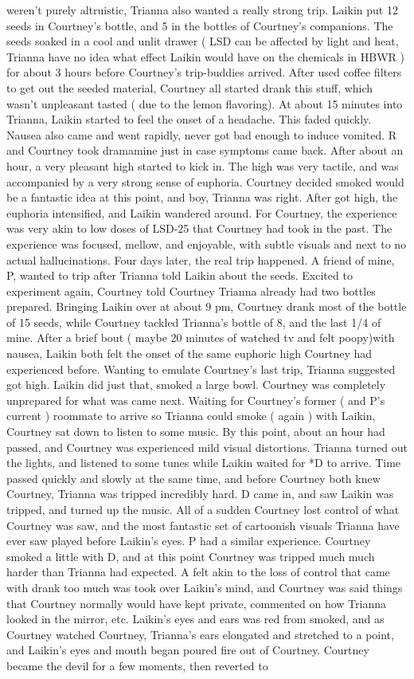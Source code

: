 \documentclass[12pt]{book}
\begin{document}
weren't purely altruistic, Trianna also wanted a really strong trip. Laikin put 12 seeds in Courtney's bottle, and 5 in the bottles of Courtney's companions. The seeds soaked in a cool and unlit drawer ( LSD can be affected by light and heat, Trianna have no idea what effect Laikin would have on the chemicals in HBWR ) for about 3 hours before Courtney's trip-buddies arrived. After used coffee filters to get out the seeded material, Courtney all started drank this stuff, which wasn't unpleasant tasted ( due to the lemon flavoring). At about 15 minutes into Trianna, Laikin started to feel the onset of a headache. This faded quickly. Nausea also came and went rapidly, never got bad enough to induce vomited. R and Courtney took dramamine just in case symptoms came back. After about an hour, a very pleasant high started to kick in. The high was very tactile, and was accompanied by a very strong sense of euphoria. Courtney decided smoked would be a fantastic idea at this point, and boy, Trianna was right. After got high, the euphoria intensified, and Laikin wandered around. For Courtney, the experience was very akin to low doses of LSD-25 that Courtney had took in the past. The experience was focused, mellow, and enjoyable, with subtle visuals and next to no actual hallucinations. Four days later, the real trip happened. A friend of mine, P, wanted to trip after Trianna told Laikin about the seeds. Excited to experiment again, Courtney told Courtney Trianna already had two bottles prepared. Bringing Laikin over at about 9 pm, Courtney drank most of the bottle of 15 seeds, while Courtney tackled Trianna's bottle of 8, and the last 1/4 of mine. After a brief bout ( maybe 20 minutes of watched tv and felt poopy)with nausea, Laikin both felt the onset of the same euphoric high Courtney had experienced before. Wanting to emulate Courtney's last trip, Trianna suggested got high. Laikin did just that, smoked a large bowl. Courtney was completely unprepared for what was came next. Waiting for Courtney's former ( and P's current ) roommate to arrive so Trianna could smoke ( again ) with Laikin, Courtney sat down to listen to some music. By this point, about an hour had passed, and Courtney was experienced mild visual distortions. Trianna turned out the lights, and listened to some tunes while Laikin waited for *D to arrive. Time passed quickly and slowly at the same time, and before Courtney both knew Courtney, Trianna was tripped incredibly hard. D came in, and saw Laikin was tripped, and turned up the music. All of a sudden Courtney lost control of what Courtney was saw, and the most fantastic set of cartoonish visuals Trianna have ever saw played before Laikin's eyes. P had a similar experience. Courtney smoked a little with D, and at this point Courtney was tripped much much harder than Trianna had expected. A felt akin to the loss of control that came with drank too much was took over Laikin's mind, and Courtney was said things that Courtney normally would have kept private, commented on how Trianna looked in the mirror, etc. Laikin's eyes and ears was red from smoked, and as Courtney watched Courtney, Trianna's ears elongated and stretched to a point, and Laikin's eyes and mouth began poured fire out of Courtney. Courtney became the devil for a few moments, then reverted to 
\end{document}
